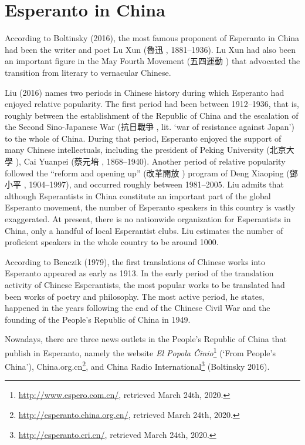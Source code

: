 \section{Esperanto in China}
According to Boltinsky (2016), the most famous proponent of Esperanto in China had been the writer and poet Lu Xun (魯迅 , 1881--1936).
Lu Xun had also been an important figure in the May Fourth Movement (五四運動 ) that advocated the transition from literary to vernacular Chinese.

Liu (2016) names two periods in Chinese history during which Esperanto had enjoyed relative popularity.
The first period had been between 1912--1936, that is, roughly between the establishment of the Republic of China and the escalation of the Second Sino-Japanese War (抗日戰爭 , lit. `war of resistance against Japan') to the whole of China.
During that period, Esperanto enjoyed the support of many Chinese intellectuals, including the president of Peking University (北京大學 ), Cai Yuanpei (蔡元培 , 1868--1940).
Another period of relative popularity followed the ``reform and opening up'' (改革開放 ) program of Deng Xiaoping (鄧小平 , 1904--1997), and occurred roughly between 1981--2005.
Liu admits that although Esperantists in China constitute an important part of the global Esperanto movement, the number of Esperanto speakers in this country is vastly exaggerated.
At present, there is no nationwide organization for Esperantists in China, only a handful of local Esperantist clubs.
Liu estimates the number of proficient speakers in the whole country to be around 1000.

According to Benczik (1979), the first translations of Chinese works into Esperanto appeared as early as 1913.
In the early period of the translation activity of Chinese Esperantists, the most popular works to be translated had been works of poetry and philosophy.
The most active period, he states, happened in the years following the end of the Chinese Civil War and the founding of the People's Republic of China in 1949.

Nowadays, there are three news outlets in the People's Republic of China that publish in Esperanto, namely the website \textit{El Popola Ĉinio}\footnote{\url{http://www.espero.com.cn/}, retrieved March 24th, 2020.} (`From People's China'), China.org.cn\footnote{\url{http://esperanto.china.org.cn/}, retrieved March 24th, 2020.},
and China Radio International\footnote{\url{http://esperanto.cri.cn/}, retrieved March 24th, 2020.}
(Boltinsky 2016).

